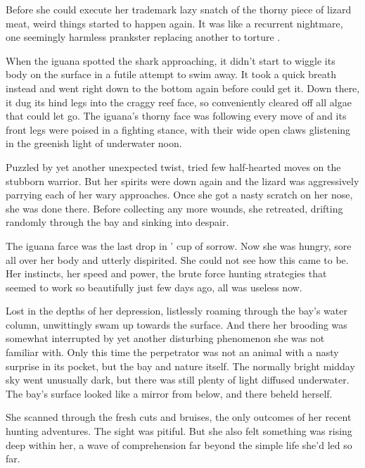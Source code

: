 Before she could execute her trademark lazy snatch of the thorny piece of lizard meat, weird things started to happen again. It was like a recurrent nightmare, one seemingly harmless prankster replacing another to torture \sharknameformal.

When the iguana spotted the shark approaching, it didn't start to wiggle its body on the surface in a futile attempt to swim away. It took a quick breath instead and went right down to the bottom again before \sharknameformal could get it. Down there, it dug its hind legs into the craggy reef face, so conveniently cleared off all algae that could let go. The iguana's thorny face was following every move of \sharknameformal and its front legs were poised in a fighting stance, with their wide open claws glistening in the greenish light of underwater noon.

Puzzled by yet another unexpected twist, \sharknameformal tried few half-hearted moves on the stubborn warrior. But her spirits were down again and the lizard was aggressively parrying each of her wary approaches. Once she got a nasty scratch on her nose, she was done there. Before collecting any more wounds, she retreated, drifting randomly through the bay and sinking into despair.

\mybreak

The iguana farce was the last drop in \sharknameformal' cup of sorrow. Now she was hungry, sore all over her body and utterly dispirited. She could not see how this came to be. Her instincts, her speed and power, the brute force hunting strategies that seemed to work so beautifully just few days ago, all was useless now. 

Lost in the depths of her depression, listlessly roaming through the bay's water column, \sharknameformal unwittingly swam up towards the surface. And there her brooding was somewhat interrupted by yet another disturbing phenomenon she was not familiar with. Only this time the perpetrator was not an animal with a nasty surprise in its pocket, but the bay and nature itself. The normally bright midday sky went unusually dark, but there was still plenty of light diffused underwater. The bay's surface looked like a mirror from below, and there \sharknameformal beheld herself. 

She scanned through the fresh cuts and bruises, the only outcomes of her recent hunting adventures. The sight was pitiful. But she also felt something was rising deep within her, a wave of comprehension far beyond the simple life she'd led so far. 

